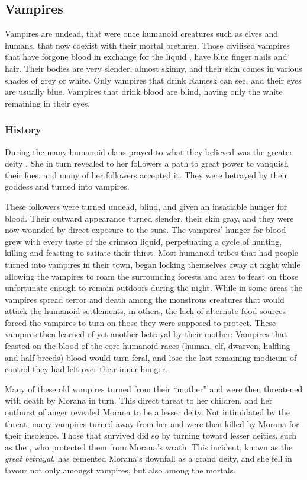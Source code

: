 \subsection{Vampires}
\label{sec:Vampires}

Vampires are undead, that were once humanoid creatures such as elves and
humans, that now coexist with their mortal brethren. Those civilised vampires
that have forgone blood in exchange for the liquid , have
blue finger nails and hair. Their bodies are very slender, almost skinny, and
their skin comes in various shades of grey or white. Only vampires that drink
Ramesk can see, and their eyes are usually blue. Vampires that drink blood are
blind, having only the white remaining in their eyes.

\subsubsection{History}

During the  many humanoid clans prayed to what
they believed was the greater deity . She in turn revealed
to her followers a path to great power to vanquish their foes, and many of her
followers accepted it. They were betrayed by their goddess and turned into
vampires.

These followers were turned undead, blind, and given an insatiable hunger for
blood. Their outward appearance turned slender, their skin gray, and they were
now wounded by direct exposure to the suns. The vampires' hunger for blood
grew with every taste of the crimson liquid, perpetuating a cycle of hunting,
killing and feasting to satiate their thirst. Most humanoid tribes that had
people turned into vampires in their town, began locking themselves away at
night while allowing the vampires to roam the surrounding forests and area to
feast on those unfortunate enough to remain outdoors during the night. While
in some areas the vampires spread terror and death among the monstrous
creatures that would attack the humanoid settlements, in others, the lack of
alternate food sources forced the vampires to turn on those they were supposed
to protect. These vampires then learned of yet another betrayal by their
mother: Vampires that feasted on the blood of the core humanoid races (human,
elf, dwarven, halfling and half-breeds) blood would turn feral, and lose the
last remaining modicum of control they had left over their inner hunger.

Many of these old vampires turned from their ``mother'' and were then
threatened with death by Morana in turn. This direct threat to her children,
and her outburst of anger revealed Morana to be a lesser deity. Not
intimidated by the threat, many vampires turned away from her and were then
killed by Morana for their insolence. Those that survived did so by turning
toward lesser deities, such as the , who protected
them from Morana's wrath. This incident, known as the \emph{great betrayal},
has cemented Morana's downfall as a grand deity, and she fell in favour not
only amongst vampires, but also among the mortals.

